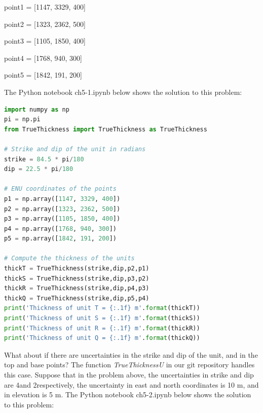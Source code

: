 \documentclass[a4paper , 12pt]{book}
\begin{document}
point1 = [1147, 3329, 400]

point2 = [1323, 2362, 500]

point3 = [1105, 1850, 400]

point4 = [1768, 940, 300]

point5 = [1842, 191, 200]

The Python notebook ch5-1.ipynb below shows the solution to this problem:

\begin{center}
\begin{lstlisting}[language=Python, frame=single]
import numpy as np
pi = np.pi
from TrueThickness import TrueThickness as TrueThickness

# Strike and dip of the unit in radians
strike = 84.5 * pi/180
dip = 22.5 * pi/180

# ENU coordinates of the points
p1 = np.array([1147, 3329, 400]) 
p2 = np.array([1323, 2362, 500]) 
p3 = np.array([1105, 1850, 400]) 
p4 = np.array([1768, 940, 300]) 
p5 = np.array([1842, 191, 200])

# Compute the thickness of the units
thickT = TrueThickness(strike,dip,p2,p1)
thickS = TrueThickness(strike,dip,p3,p2)
thickR = TrueThickness(strike,dip,p4,p3)
thickQ = TrueThickness(strike,dip,p5,p4)
print('Thickness of unit T = {:.1f} m'.format(thickT))
print('Thickness of unit S = {:.1f} m'.format(thickS))
print('Thickness of unit R = {:.1f} m'.format(thickR))
print('Thickness of unit Q = {:.1f} m'.format(thickQ))
\end{lstlisting}
\end{center}

What about if there are uncertainties in the strike and dip of the unit, and in the top and base points? The function \textit{TrueThicknessU} in our git repository handles this case. Suppose that in the problem above, the uncertainties in strike and dip are 4\degree and 2\degree respectively, the uncertainty in east and north coordinates is 10 m, and in elevation is 5 m. The Python notebook ch5-2.ipynb below shows the solution to this problem:
\end{document}
